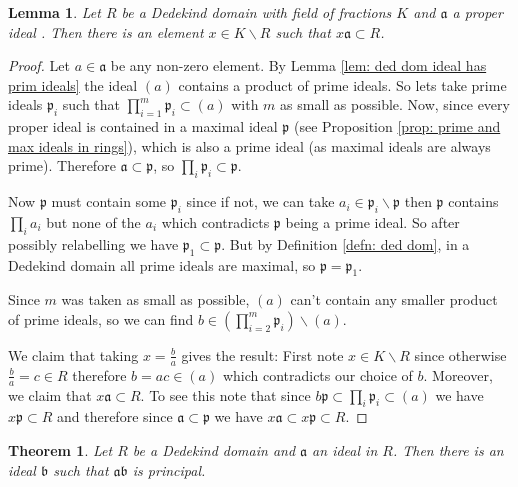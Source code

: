\documentclass[11pt,a4paper]{report}
\theoremstyle{plain}
\newtheorem{thm}[subsection]{Theorem}
\newtheorem{lem}[subsection]{Lemma}
\theoremstyle{definition}
\theoremstyle{definition}
\def\gothb{\mathfrak{b}}
\def\gothp{\mathfrak{p}}
\def\gotha{\mathfrak{a}}
\begin{document}
	\begin{lem}\label{lem: proper ideal mult by frac is still int}
		Let $R$ be a Dedekind domain with field of fractions $K$ and $\gotha$ a proper ideal . Then there is an element $x \in K \backslash R$ such that $x \gotha \subset R$.
	\end{lem}
	
	\begin{proof}
		Let $a \in \gotha$ be any non-zero element. By Lemma \ref{lem: ded dom ideal has prim ideals} the ideal $(a)$ contains a product of prime ideals. So lets take prime ideals $\gothp_i$ such that  $\prod_{i=1}^m \gothp_i \subset (a)$ with $m$ as small as possible. Now, since every proper ideal is contained in a maximal ideal $\gothp$ (see Proposition \ref{prop: prime and max ideals in rings}), which is also a prime ideal (as maximal ideals are always prime). Therefore $\gotha \subset \gothp$, so $\prod_i \gothp_i \subset \gothp$. 
		
		Now $\gothp$ must contain some $\gothp_i$ since if not, we can take $a_i \in \gothp_i \backslash \gothp$ then $\gothp$ contains $\prod_i a_i$ but none of the $a_i$ which contradicts $\gothp$ being a prime ideal. So after possibly relabelling we have $\gothp_1 \subset \gothp$. But by Definition \ref{defn: ded dom}, in a Dedekind domain all prime ideals are maximal, so $\gothp=\gothp_1$.
		
		Since $m$ was taken as small as possible, $(a)$ can't contain any smaller product of prime ideals, so we can find $b \in (\prod_{i=2}^m \gothp_i) \backslash (a)$. 
		
		We claim that taking $x=\frac{b}{a}$ gives the result: First note $x \in K \backslash R$ since otherwise $\frac{b}{a}=c \in R$ therefore $b=ac \in (a)$ which contradicts our choice of $b$. Moreover, we claim that $x \gotha \subset R$. To see this note that since $b \gothp \subset \prod_i \gothp_i \subset (a)$ we have $x \gothp \subset R$ and therefore since $\gotha \subset \gothp$ we have $x\gotha \subset x\gothp \subset R$.
		
		
		
	\end{proof}
	
	
	\begin{thm}\label{thm: ideals are invertible}
		Let $R$ be a Dedekind domain and $\gotha$ an ideal in $R$. Then there is an ideal $\gothb$ such that $\gotha \gothb$ is principal.
	\end{thm}
	
\end{document}
